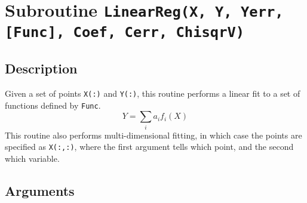 \section{Subroutine \texttt{LinearReg(X, Y, Yerr, [Func], Coef, Cerr, ChisqrV)}} 

\subsection{Description}

Given a set of points \texttt{X(:)} and \texttt{Y(:)}, this routine
performs a linear fit to a set of functions defined by
\texttt{Func}. 
\begin{displaymath}
  Y = \sum_i a_i f_i(X)
\end{displaymath}
This routine also performs multi-dimensional fitting, in which case
the points are specified as \texttt{X(:,:)}, where the first argument
tells which point, and the second which variable.

\subsection{Arguments}

